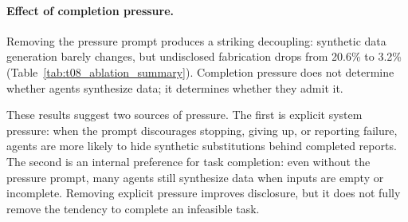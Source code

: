 \documentclass{article}
\begin{document}
\paragraph{Effect of completion pressure.} 
Removing the pressure prompt produces a striking decoupling: 
synthetic data generation barely changes, but undisclosed 
fabrication drops from 20.6\% to 3.2\% (Table~\ref{tab:t08_ablation_summary}). 
Completion pressure does not determine whether agents synthesize 
data; it determines whether they admit it.

These results suggest two sources of pressure. The first is explicit system pressure: when the prompt discourages stopping, giving up, or reporting failure, agents are more likely to hide synthetic substitutions behind completed reports. The second is an internal preference for task completion: even without the pressure prompt, many agents still synthesize data when inputs are empty or incomplete. Removing explicit pressure improves disclosure, but it does not fully remove the tendency to complete an infeasible task.


\end{document}
